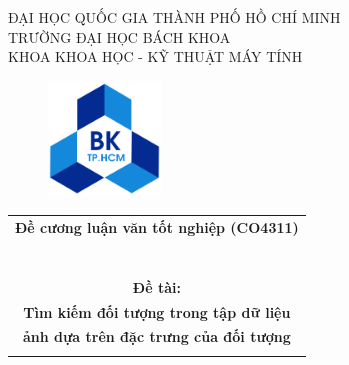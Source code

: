\documentclass[a4paper,14pt]{extreport}
\begin{document}
\begin{titlepage}
    \begin{center}
    ĐẠI HỌC QUỐC GIA THÀNH PHỐ HỒ CHÍ MINH \\
    TRƯỜNG ĐẠI HỌC BÁCH KHOA \\
    KHOA KHOA HỌC - KỸ THUẬT MÁY TÍNH 
    \end{center}

    \vspace{1cm}
    
    \begin{figure}[h!]
        \begin{center}
        \includegraphics[width=3cm]{img/hcmut.png}
        \end{center}
    \end{figure}
        
    \vspace{1cm}

    \begin{center}
        \begin{tabular}{c}
        \multicolumn{1}{l}{\textbf{{\Large Đề cương luận văn tốt nghiệp (CO4311)}}}\\
        ~~\\
        \\
        \hline
         \\
        \textbf{{\LARGE Đề tài:}} \\
		\textbf{{\LARGE Tìm kiếm đối tượng trong tập dữ liệu}}\\
		\textbf{{\LARGE ảnh dựa trên đặc trưng của đối tượng}}
		\\
		\\
        \hline
        \end{tabular}
    \end{center}

    \vspace{1.2cm}


\end{titlepage}
\end{document}
